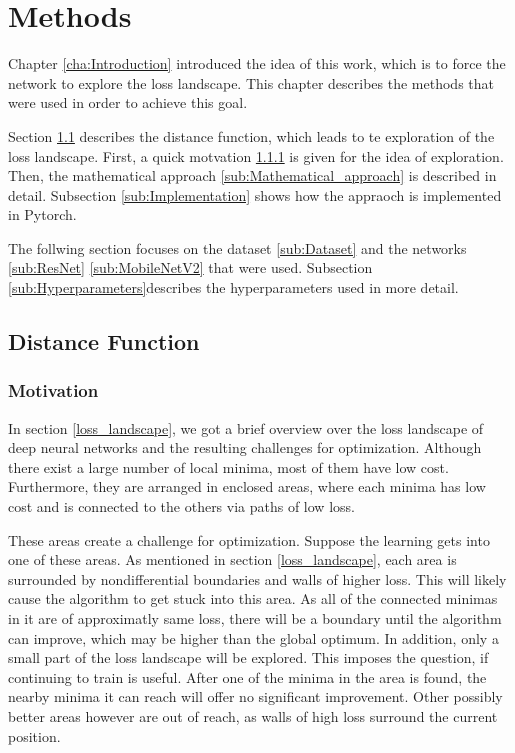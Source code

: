 \chapter{Methods}\label{cha:Methods}

Chapter \ref{cha:Introduction} introduced the idea of this work, which is to
force the network to explore the loss landscape. This chapter describes the
methods that were used in order to achieve this goal. 

Section \ref{seq:Distance} describes the distance function, which leads to te
exploration of the loss landscape. First, a quick motvation \ref{sub:Motivation}
is given for the idea of exploration. Then, the mathematical approach
\ref{sub:Mathematical_approach} is described in detail. Subsection
\ref{sub:Implementation} shows how the appraoch is implemented in Pytorch.

The follwing section focuses on the dataset \ref{sub:Dataset} and the networks
\ref{sub:ResNet} \ref{sub:MobileNetV2} that were used. Subsection
\ref{sub:Hyperparameters}describes the hyperparameters used in more detail.


\section{Distance Function}\label{seq:Distance}
\subsection{Motivation}\label{sub:Motivation} In section \ref{loss_landscape},
we got a brief overview over the loss landscape of deep neural networks and the
resulting challenges for optimization. Although there exist a large number of
local minima, most of them have low cost. Furthermore, they are arranged in
enclosed areas, where each minima has low cost and is connected to the others
via paths of low loss.

These areas create a challenge for optimization. Suppose the learning gets into
one of these areas. As mentioned in section \ref{loss_landscape}, each area is
surrounded by nondifferential boundaries and walls of higher loss. This will
likely cause the algorithm to get stuck into this area. As all of the connected
minimas in it are of approximatly same loss, there will be a boundary until the
algorithm can improve, which may be higher than the global optimum. In addition,
only a small part of the loss landscape will be explored. This imposes the
question, if continuing to train is useful. After one of the minima in the area
is found, the nearby minima it can reach will offer no significant improvement.
Other possibly better areas however are out of reach, as walls of high loss
surround the current position.

